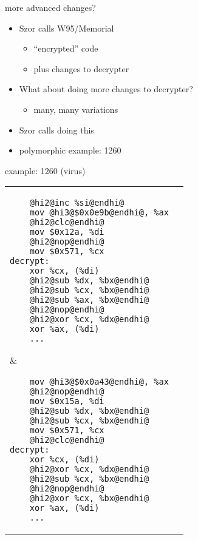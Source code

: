 \begin{frame}{more advanced changes?}
    \begin{itemize}
    \item Szor calls W95/Memorial 
        \begin{itemize}
        \item ``encrypted'' code
        \item plus  changes to decrypter
        \end{itemize}
    \item What about doing more changes to decrypter?
        \begin{itemize}
        \item many, many variations
        \end{itemize}
    \item Szor calls doing this 
    \item polymorphic example: 1260
    \end{itemize}
\end{frame}

\begin{frame}[fragile,label=v1260]{example: 1260 (virus)}
\begin{tabular}{ll}
\begin{lstlisting}
    @hi2@inc %si@endhi@
    mov @hi3@$0x0e9b@endhi@, %ax
    @hi2@clc@endhi@
    mov $0x12a, %di
    @hi2@nop@endhi@
    mov $0x571, %cx
decrypt:
    xor %cx, (%di)
    @hi2@sub %dx, %bx@endhi@
    @hi2@sub %cx, %bx@endhi@
    @hi2@sub %ax, %bx@endhi@
    @hi2@nop@endhi@
    @hi2@xor %cx, %dx@endhi@
    xor %ax, (%di)
    ...
\end{lstlisting}
&
\begin{lstlisting}
    mov @hi3@$0x0a43@endhi@, %ax
    @hi2@nop@endhi@
    mov $0x15a, %di
    @hi2@sub %dx, %bx@endhi@
    @hi2@sub %cx, %bx@endhi@
    mov $0x571, %cx
    @hi2@clc@endhi@
decrypt:
    xor %cx, (%di)
    @hi2@xor %cx, %dx@endhi@
    @hi2@sub %cx, %bx@endhi@
    @hi2@nop@endhi@
    @hi2@xor %cx, %bx@endhi@
    xor %ax, (%di)
    ...
\end{lstlisting}
\end{tabular}
\end{frame}

